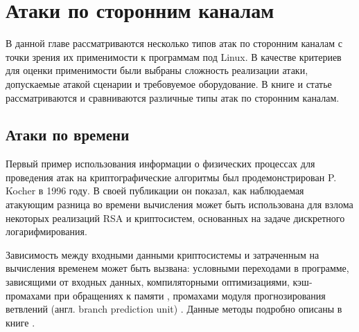 \section{Атаки по сторонним каналам} \label{sec:sca}

В данной главе рассматриваются несколько типов атак по сторонним каналам с
точки зрения их применимости к программам под Linux. В качестве критериев для
оценки применимости были выбраны сложность реализации атаки, допускаемые атакой
сценарии и требовуемое оборудование. В книге \cite{cren} и статье \cite{10years}
рассматриваются и сравниваются различные типы атак по сторонним каналам.



\subsection{Атаки по времени}

Первый пример использования информации о физических процессах для проведения
атак на криптографические алгоритмы был продемонстрирован P. Kocher в 1996 году.
В своей публикации \cite{kocher} он показал, как наблюдаемая атакующим разница
во времени вычисления может быть использована для взлома некоторых реализаций
RSA и криптосистем, основанных на задаче дискретного логарифмирования.

Зависимость между входными данными криптосистемы и затраченным на вычисления
временем может быть вызвана: условными переходами в программе, зависящими от
входных данных, компиляторными оптимизациями, кэш-промахами при обращениях к
памяти \cite{bernstein}, промахами модуля прогнозирования ветвлений (англ.
branch prediction unit) \cite{bpa} \cite{sbpa}. Данные методы подробно описаны в
книге \cite{cren}.


